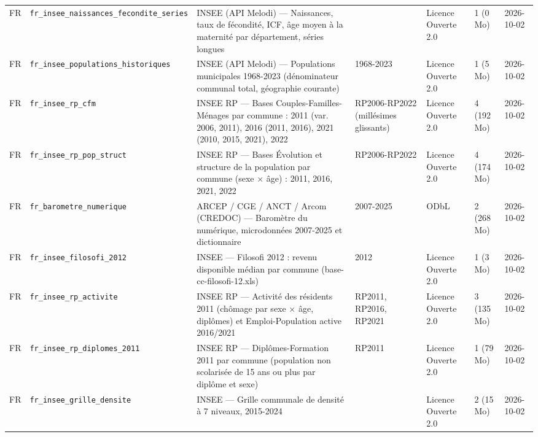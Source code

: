 \begin{longtable}{lp{2.2cm}p{3.9cm}p{2.1cm}p{1.9cm}p{1.4cm}p{1.6cm}}
FR & \texttt{fr\_\allowbreak{}insee\_\allowbreak{}naissances\_\allowbreak{}fecondite\_\allowbreak{}series} & INSEE (API Melodi) — Naissances, taux de fécondité, ICF, âge moyen à la maternité par département, séries longues &  & Licence Ouverte 2.0 & 1 (0 Mo) & 2026-10-02 \\
FR & \texttt{fr\_\allowbreak{}insee\_\allowbreak{}populations\_\allowbreak{}historiques} & INSEE (API Melodi) — Populations municipales 1968-2023 (dénominateur communal total, géographie courante) & 1968-2023 & Licence Ouverte 2.0 & 1 (5 Mo) & 2026-10-02 \\
FR & \texttt{fr\_\allowbreak{}insee\_\allowbreak{}rp\_\allowbreak{}cfm} & INSEE RP — Bases Couples-Familles-Ménages par commune : 2011 (var. 2006, 2011), 2016 (2011, 2016), 2021 (2010, 2015, 2021), 2022 & RP2006-RP2022 (millésimes glissants) & Licence Ouverte 2.0 & 4 (192 Mo) & 2026-10-02 \\
FR & \texttt{fr\_\allowbreak{}insee\_\allowbreak{}rp\_\allowbreak{}pop\_\allowbreak{}struct} & INSEE RP — Bases Évolution et structure de la population par commune (sexe × âge) : 2011, 2016, 2021, 2022 & RP2006-RP2022 & Licence Ouverte 2.0 & 4 (174 Mo) & 2026-10-02 \\
FR & \texttt{fr\_\allowbreak{}barometre\_\allowbreak{}numerique} & ARCEP / CGE / ANCT / Arcom (CREDOC) — Baromètre du numérique, microdonnées 2007-2025 et dictionnaire & 2007-2025 & ODbL & 2 (268 Mo) & 2026-10-02 \\
FR & \texttt{fr\_\allowbreak{}insee\_\allowbreak{}filosofi\_\allowbreak{}2012} & INSEE — Filosofi 2012 : revenu disponible médian par commune (base-cc-filosofi-12.xls) & 2012 & Licence Ouverte 2.0 & 1 (3 Mo) & 2026-10-02 \\
FR & \texttt{fr\_\allowbreak{}insee\_\allowbreak{}rp\_\allowbreak{}activite} & INSEE RP — Activité des résidents 2011 (chômage par sexe × âge, diplômes) et Emploi-Population active 2016/2021 & RP2011, RP2016, RP2021 & Licence Ouverte 2.0 & 3 (135 Mo) & 2026-10-02 \\
FR & \texttt{fr\_\allowbreak{}insee\_\allowbreak{}rp\_\allowbreak{}diplomes\_\allowbreak{}2011} & INSEE RP — Diplômes-Formation 2011 par commune (population non scolarisée de 15 ans ou plus par diplôme et sexe) & RP2011 & Licence Ouverte 2.0 & 1 (79 Mo) & 2026-10-02 \\
FR & \texttt{fr\_\allowbreak{}insee\_\allowbreak{}grille\_\allowbreak{}densite} & INSEE — Grille communale de densité à 7 niveaux, 2015-2024 &  & Licence Ouverte 2.0 & 2 (15 Mo) & 2026-10-02 \\

\end{longtable}
